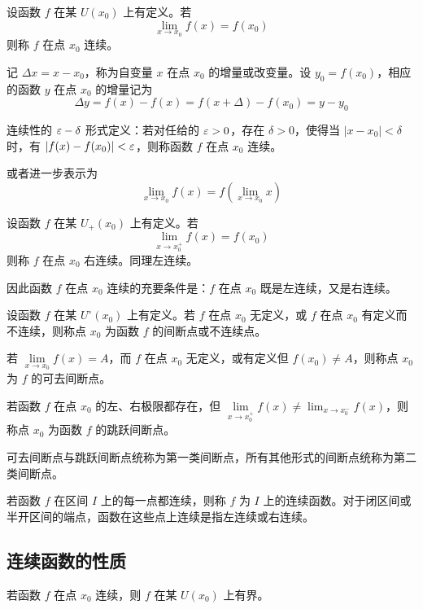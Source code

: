 \begin{definition}[连续性]
	设函数 $f$ 在某 $U(x_0)$ 上有定义。若
	\[ \lim_{x\to x_0}f(x) = f(x_0) \]
	则称 $f$ 在点 $x_0$ 连续。
\end{definition}

记 $\Delta x = x-x_0$，称为自变量 $x$ 在点 $x_0$ 的增量或改变量。设 $y_0=f(x_0)$，相应的函数 $y$ 在点 $x_0$ 的增量记为
\[ \Delta y = f(x)-f(x) = f(x+\Delta)-f(x_0) = y-y_0 \]

连续性的 $\varepsilon-\delta$ 形式定义：若对任给的 $\varepsilon>0$，存在 $\delta>0$，使得当 $|x-x_0|<\delta$ 时，有 $|f(x)-f(x_0)|<\varepsilon$，则称函数 $f$ 在点 $x_0$ 连续。

或者进一步表示为
\[ \lim_{x\to x_0}f(x) = f\left(\lim_{x\to x_0}x\right) \]

\begin{definition}
	设函数 $f$ 在某 $U_+(x_0)$ 上有定义。若
	\[ \lim_{x\to x_0^+}f(x) = f(x_0) \]
	则称 $f$ 在点 $x_0$ 右连续。同理左连续。
\end{definition}

因此函数 $f$ 在点 $x_0$ 连续的充要条件是：$f$ 在点 $x_0$ 既是左连续，又是右连续。

\begin{definition}[间断点]
	设函数 $f$ 在某 $U^\circ(x_0)$ 上有定义。若 $f$ 在点 $x_0$ 无定义，或 $f$ 在点 $x_0$ 有定义而不连续，则称点 $x_0$ 为函数 $f$ 的间断点或不连续点。
\end{definition}

若 $\lim\limits_{x\to x_0}f(x)=A$，而 $f$ 在点 $x_0$ 无定义，或有定义但 $f(x_0)\ne A$，则称点 $x_0$ 为 $f$ 的可去间断点。

若函数 $f$ 在点 $x_0$ 的左、右极限都存在，但 $\lim\limits_{x\to x_0^+}f(x) \ne \lim_{x\to x_0^-}f(x)$，则称点 $x_0$ 为函数 $f$ 的跳跃间断点。

可去间断点与跳跃间断点统称为第一类间断点，所有其他形式的间断点统称为第二类间断点。

若函数 $f$ 在区间 $I$ 上的每一点都连续，则称 $f$ 为 $I$ 上的连续函数。对于闭区间或半开区间的端点，函数在这些点上连续是指左连续或右连续。

\subsection{连续函数的性质}

\begin{theorem}[局部有界性]
	若函数 $f$ 在点 $x_0$ 连续，则 $f$ 在某 $U(x_0)$ 上有界。
\end{theorem}

